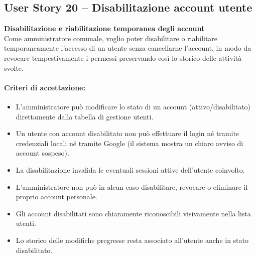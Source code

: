 \subsection{User Story 20 – Disabilitazione account utente}
\label{us:disabilitazioneAccount}

\textbf{Disabilitazione e riabilitazione temporanea degli account} \\
Come amministratore comunale, voglio poter disabilitare o riabilitare temporaneamente l'accesso di un utente senza cancellarne l'account, in modo da revocare tempestivamente i permessi preservando così lo storico delle attività svolte.

\paragraph*{Criteri di accettazione:}
\begin{itemize}
    \item L'amministratore può modificare lo stato di un account (attivo/disabilitato) direttamente dalla tabella di gestione utenti.
    \item Un utente con account disabilitato non può effettuare il login né tramite credenziali locali né tramite Google (il sistema mostra un chiaro avviso di account sospeso).
    \item La disabilitazione invalida le eventuali sessioni attive dell'utente coinvolto.
    \item L'amministratore non può in alcun caso disabilitare, revocare o eliminare il proprio account personale.
    \item Gli account disabilitati sono chiaramente riconoscibili visivamente nella lista utenti.
    \item Lo storico delle modifiche pregresse resta associato all'utente anche in stato disabilitato.
\end{itemize}

